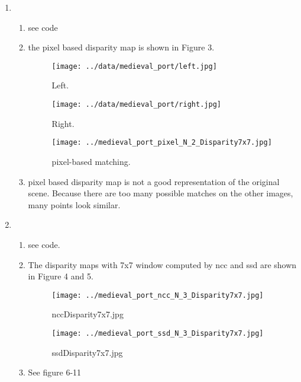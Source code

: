 \documentclass[a4paper, twoside, english]{article}
\begin{document}
\begin{enumerate}
	\item 
	\begin{enumerate}
		\item see code
		\item the pixel based disparity map is shown in Figure 3.
			\begin{figure}[h!]
			\begin{minipage}[b]{0.3\textwidth}
				\texttt{[image: ../data/medieval\_port/left.jpg]}
				\caption{Left.}
			\end{minipage}
			\hfill
			\begin{minipage}[b]{0.3\textwidth}
				\texttt{[image: ../data/medieval\_port/right.jpg]}
				\caption{Right.}
			\end{minipage}
			\hfill
			\begin{minipage}[b]{0.3\textwidth}
				\texttt{[image: ../medieval\_port\_pixel\_N\_2\_Disparity7x7.jpg]}
				\caption{pixel-based matching.}
			\end{minipage}
			\hfill
		\end{figure}
		\item pixel based disparity map is not a good representation of the original scene. Because there are too many possible matches on the other images, many points look similar.
	\end{enumerate}
	\item 
	\begin{enumerate}
		\item see code.
		\item The disparity maps with 7x7 window computed by ncc and ssd are shown in Figure 4 and 5. 
		\begin{figure}[h!]
			\begin{minipage}[b]{0.45\textwidth}
				\texttt{[image: ../medieval\_port\_ncc\_N\_3\_Disparity7x7.jpg]}
				\caption{nccDisparity7x7.jpg}
			\end{minipage}
			\hfill
			\begin{minipage}[b]{0.45\textwidth}
				\texttt{[image: ../medieval\_port\_ssd\_N\_3\_Disparity7x7.jpg]}
				\caption{ssdDisparity7x7.jpg}
			\end{minipage}
			\hfill
		\end{figure}
		\item See figure 6-11
		\begin{figure}[h!]
			\begin{minipage}[b]{0.3\textwidth}

\end{minipage}
\end{figure}
\end{enumerate}
\end{enumerate}
\end{document}
